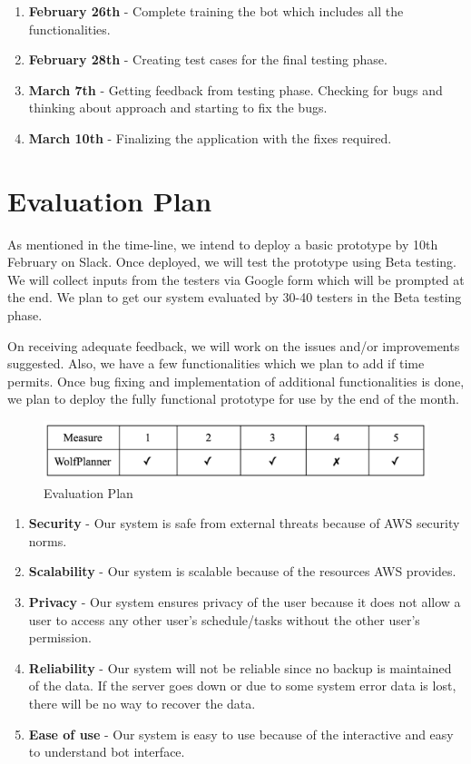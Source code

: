 \documentclass{sig-alternate-05-2015}
\begin{document}
\begin{enumerate}
\item \textbf{February 26th} - Complete training the bot which includes all the functionalities.

\item \textbf{February 28th} - Creating test cases for the final testing phase.

\item \textbf{March 7th} - Getting feedback from testing phase. Checking for bugs and thinking about approach and starting to fix the bugs.

\item \textbf{March 10th} - Finalizing the application with the fixes required.
\end{enumerate}


\section{Evaluation Plan}
As mentioned in the time-line, we intend to deploy a basic prototype by 10th February on Slack. Once deployed, we will test the prototype using Beta testing. We will collect inputs from the testers via Google form which will be prompted at the end. We plan to get our system evaluated by 30-40 testers in the Beta testing phase. 
\par
On receiving adequate feedback, we will work on the issues and/or improvements suggested. Also, we have a few functionalities which we plan to add if time permits. Once bug fixing and implementation of additional functionalities is done, we plan to deploy the fully functional prototype for use by the end of the month.
\begin{figure}[!htbp]
\includegraphics[scale = 0.4]{EP}
\centering
\caption{Evaluation Plan}
\end{figure}
\begin{enumerate}
\item \textbf{Security} - Our system is safe from external threats because of AWS security norms.
\item \textbf{Scalability} - Our system is scalable because of the resources AWS provides.
\item \textbf{Privacy} - Our system ensures privacy of the user because it does not allow a user to access any other user's schedule/tasks without the other user's permission.
\item \textbf{Reliability} - Our system will not be reliable since no backup is maintained of the data. If the server goes down or due to some system error data is lost, there will be no way to recover the data.
\item \textbf{Ease of use} - Our system is easy to use because of the interactive and easy to understand bot interface.
\end{enumerate}
\end{document}
